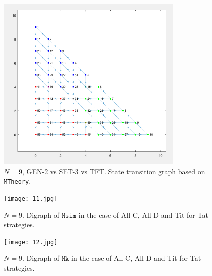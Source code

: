 \documentclass[12pt]{report}
\begin{document}
\begin{figure}
    \centering
    \includegraphics[width=0.8\textwidth]{Figure 23.png}
    \caption{$N=9$, GEN-2 vs SET-3 vs TFT. State transition graph based on \texttt{MTheory}.}
    \label{23}
\end{figure}








\begin{figure}
    \centering
    \texttt{[image: 11.jpg]}
    \caption{$N=9$. Digraph of $\texttt{Msim}$ in the case of All-C, All-D and Tit-for-Tat strategies.}
    \label{11}
\end{figure}

\begin{figure}
    \centering
    \texttt{[image: 12.jpg]}
    \caption{$N=9$. Digraph of $\texttt{Mk}$ in the case of All-C, All-D and Tit-for-Tat strategies.}
    \label{12}
\end{figure}
\end{document}
